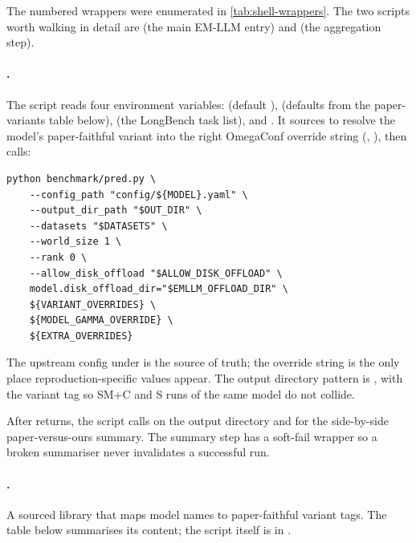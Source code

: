The numbered wrappers were enumerated in \cref{tab:shell-wrappers}. The two scripts worth walking in detail are  (the main EM-LLM entry) and  (the aggregation step).

\paragraph{.} The script reads four environment variables:  (default ),  (defaults from the paper-variants table below),  (the LongBench task list), and . It sources  to resolve the model's paper-faithful variant into the right OmegaConf override string (, ), then calls:

\begin{lstlisting}[style=shellstyle,basicstyle=\ttfamily\footnotesize]
python benchmark/pred.py \
    --config_path "config/${MODEL}.yaml" \
    --output_dir_path "$OUT_DIR" \
    --datasets "$DATASETS" \
    --world_size 1 \
    --rank 0 \
    --allow_disk_offload "$ALLOW_DISK_OFFLOAD" \
    model.disk_offload_dir="$EMLLM_OFFLOAD_DIR" \
    ${VARIANT_OVERRIDES} \
    ${MODEL_GAMMA_OVERRIDE} \
    ${EXTRA_OVERRIDES}
\end{lstlisting}
The upstream config under  is the source of truth; the override string is the only place reproduction-specific values appear. The output directory pattern is , with the variant tag so SM+C and S runs of the same model do not collide.

After \file{pred.py} returns, the script calls  on the output directory and  for the side-by-side paper-versus-ours summary. The summary step has a soft-fail wrapper so a broken summariser never invalidates a successful run.

\paragraph{\filehead{\_paper\_variants.sh}.} A sourced library that maps model names to paper-faithful variant tags. The table below summarises its content; the script itself is in .

